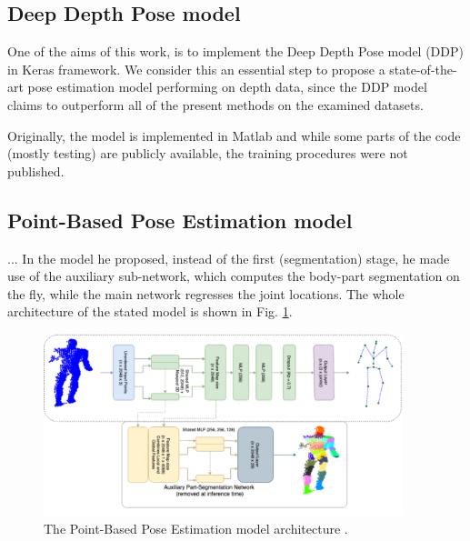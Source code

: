 \subsection{Deep Depth Pose model}
One of the aims of this work, is to implement the Deep Depth Pose model (DDP) \cite{Marin18jvcir} in Keras framework. We consider this an essential step to propose a state-of-the-art pose estimation model performing on depth data, since the DDP model claims to outperform all of the present methods on the examined datasets.\par
\vspace{5mm}
\noindent
Originally, the model is implemented in Matlab and while some parts of the code (mostly testing) are publicly available, the training procedures were not published. 

\subsection{Point-Based Pose Estimation model}

...\newline
In the model he proposed, instead of the first (segmentation) stage, he made use of the auxiliary sub-network, which computes the body-part segmentation on the fly, while the main network regresses the joint locations. The whole architecture of the stated model is shown in Fig. \ref{fig:PBPE}. \par
\vspace{5mm}
\begin{figure}[H]
\begin{center}
  \includegraphics[height=200px]{images/related_work/pbpe2.PNG}
  \caption{The Point-Based Pose Estimation model architecture \cite{Ali19}.}
  \label{fig:PBPE}
\end{center}
\end{figure}

